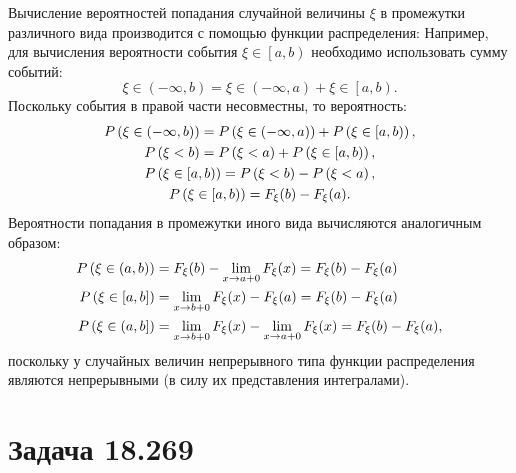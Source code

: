 Вычисление вероятностей попадания случайной величины $\xi$ в промежутки различного вида производится с помощью функции распределения: Например, для вычисления вероятности
события $\xi \in \left [ a, b \right )$ необходимо использовать сумму событий:
\begin{equation}
    \xi \in \left ( -\infty, b \right ) = \xi \in \left ( -\infty, a \right ) + \xi \in \left [ a, b \right ).
\end{equation}
Поскольку события в правой части несовместны, то вероятность:
\begin{gather}
    P \left ( \xi \in \left ( -\infty, b \right ) \right ) = P \left ( \xi \in \left ( -\infty, a \right ) \right ) + P \left ( \xi \in \left [ a, b \right ) \right ) , \\
    P \left ( \xi < b \right ) = P \left ( \xi < a \right ) + P \left ( \xi \in \left [ a, b \right ) \right ) , \\
    P \left ( \xi \in \left [ a, b \right ) \right ) = P \left ( \xi < b \right ) - P \left ( \xi < a \right ) , \\
    P \left ( \xi \in \left [ a, b \right ) \right ) = F_{\xi}(b) - F_{\xi}(a) .
\end{gather}
Вероятности попадания в промежутки иного вида вычисляются аналогичным образом:
\begin{align}
    P \left ( \xi \in \left ( a, b \right ) \right ) & = F_{\xi}(b) - \lim \limits_{x \rightarrow a+0} F_{\xi}(x) = F_{\xi}(b) - F_{\xi}(a) \\
    P \left ( \xi \in \left [ a, b \right ] \right ) & = \lim \limits_{x \rightarrow b+0} F_{\xi}(x) - F_{\xi}(a) = F_{\xi}(b) - F_{\xi}(a) \\
    P \left ( \xi \in \left ( a, b \right ] \right ) & = \lim \limits_{x \rightarrow b+0} F_{\xi}(x) - \lim \limits_{x \rightarrow a+0} F_{\xi}(x) = F_{\xi}(b) - F_{\xi}(a),
\end{align}
поскольку у случайных величин непрерывного типа функции распределения являются непрерывными (в силу их представления интегралами).

\section*{Задача 18.269}

